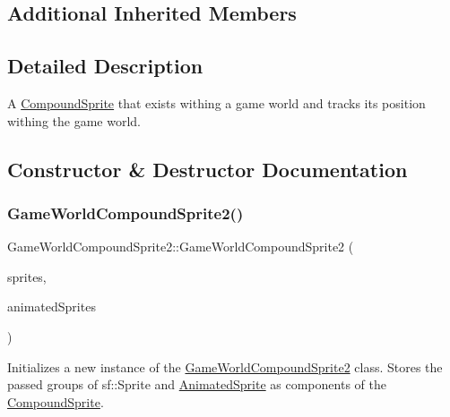 \subsection*{Additional Inherited Members}


\subsection{Detailed Description}
A \hyperlink{class_compound_sprite}{Compound\+Sprite} that exists withing a game world and tracks its position withing the game world. 



\subsection{Constructor \& Destructor Documentation}
\mbox{\label{class_game_world_compound_sprite2_a09c16ebe74d35c5d56259ec8b1f6c8ca}} 
\subsubsection{\texorpdfstring{Game\+World\+Compound\+Sprite2()}{GameWorldCompoundSprite2()}}
{\footnotesize\ttfamily Game\+World\+Compound\+Sprite2\+::\+Game\+World\+Compound\+Sprite2 (\begin{DoxyParamCaption}\item[{const std\+::vector$<$ sf\+::\+Sprite $\ast$$>$ \&}]{sprites,  }\item[{const std\+::vector$<$ \hyperlink{class_animated_sprite}{Animated\+Sprite} $\ast$$>$ \&}]{animated\+Sprites }\end{DoxyParamCaption})}



Initializes a new instance of the \hyperlink{class_game_world_compound_sprite2}{Game\+World\+Compound\+Sprite2} class. Stores the passed groups of sf\+::\+Sprite and \hyperlink{class_animated_sprite}{Animated\+Sprite} as components of the \hyperlink{class_compound_sprite}{Compound\+Sprite}. 


